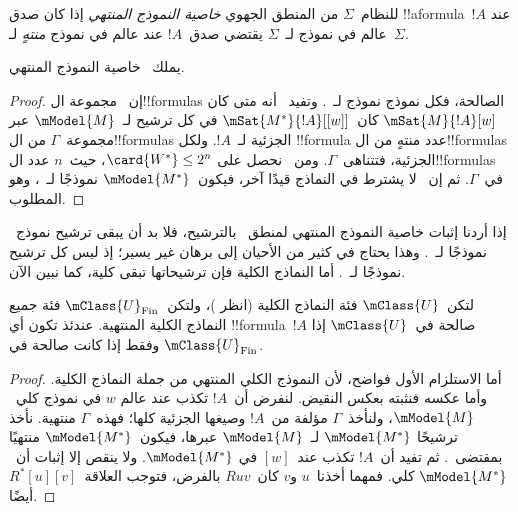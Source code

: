 \documentclass[../../../include/open-logic-section]{subfiles}
\begin{document}


\begin{defn}
  للنظام~$\Sigma$ من المنطق الجهوي \emph{خاصية النموذج المنتهي} إذا
  كان صدق !!a{formula}~$!A$ عند عالم في نموذج لـ~$\Sigma$ يقتضي
  صدق~$!A$ عند عالم في نموذج \emph{منتهٍ} لـ~$\Sigma$.
\end{defn}

\begin{prop}
  يملك~ خاصية النموذج المنتهي.
\end{prop}

\begin{proof}
  إن~ مجموعة ال!!{formula}s الصالحة، فكل نموذج نموذج
  لـ~. وتفيد~ أنه متى كان
  $\mSat{M}{!A}[w]$ كان~$\mSat{M^*}{!A}[{[w]}]$ في كل ترشيح
  لـ~$\mModel{M}$ عبر مجموعة~$\Gamma$ من ال!!{formula}s الجزئية
  لـ~$!A$. ولكل !!{formula} عدد منتهٍ من ال!!{formula}s الجزئية،
  فتتناهى~$\Gamma$. ومن~ نحصل على
  $\card{W^*} \le 2^n$، حيث~$n$ عدد ال!!{formula}s في~$\Gamma$.
  ثم إن~ لا يشترط في النماذج قيدًا آخر، فيكون~$\mModel{M^*}$
  نموذجًا لـ~، وهو المطلوب.
\end{proof}

إذا أردنا إثبات خاصية النموذج المنتهي لمنطق~ بالترشيح، فلا بد
أن يبقى ترشيح نموذج~ نموذجًا لـ~. وهذا يحتاج في كثير من
الأحيان إلى برهان غير يسير؛ إذ ليس كل ترشيح نموذجًا لـ~.
أما النماذج الكلية فإن ترشيحاتها تبقى كلية، كما نبين الآن.

\begin{prop}
  لتكن~$\mClass{U}$ فئة النماذج الكلية (انظر
  )، ولتكن~$\mClass{U}_\mathrm{Fin}$
  فئة جميع النماذج الكلية المنتهية. عندئذ تكون أي !!{formula}~$!A$
  صالحة في~$\mClass{U}$ إذا وفقط إذا كانت صالحة في
  $\mClass{U}_\mathrm{Fin}$.
\end{prop}

\begin{proof}
  أما الاستلزام الأول فواضح، لأن النموذج الكلي المنتهي من جملة النماذج
  الكلية. وأما عكسه فنثبته بعكس النقيض. لنفرض أن~$!A$ تكذب عند عالم
  $w$ في نموذج كلي~$\mModel{M}$، ولنأخذ~$\Gamma$ مؤلفة من~$!A$
  وصيغها الجزئية كلها؛ فهذه~$\Gamma$ منتهية. نأخذ ترشيحًا
  $\mModel{M^*}$ لـ~$\mModel{M}$ عبرها، فيكون~$\mModel{M^*}$ منتهيًا
  بمقتضى~. ثم تفيد
   أن~$!A$ تكذب عند~$[w]$ في
  $\mModel{M^*}$. ولا ينقص إلا إثبات أن~$\mModel{M^*}$ كلي.
  فمهما أخذنا~$u$ و$v$ كان~$Ruv$ بالفرض، فتوجب
  العلاقة~$R^*[u][v]$ أيضًا.
\end{proof}
\end{document}
